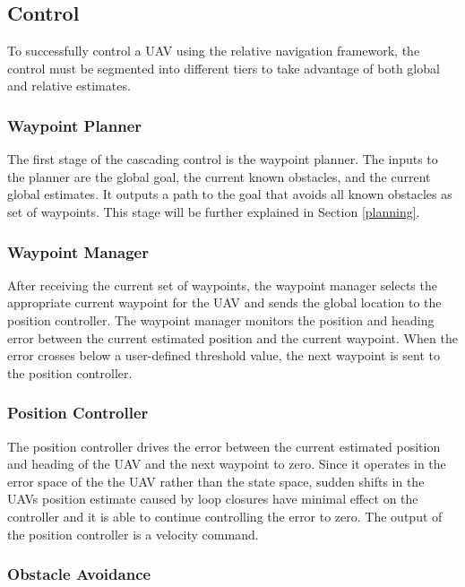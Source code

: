 \documentclass[letterpaper, 10 pt, conference]{ieeeconf}  %
\begin{document}
\subsection{Control}

To successfully control a UAV using the relative navigation framework, the control must be segmented into different tiers to take advantage of both global and relative estimates.

\subsubsection{Waypoint Planner}

The first stage of the cascading control is the waypoint planner. The inputs to the planner are the global goal, the current known obstacles, and the current global estimates. It outputs a path to the goal that avoids all known obstacles as set of waypoints. This stage will be further explained in Section \ref{planning}.

\subsubsection{Waypoint Manager}

After receiving the current set of waypoints, the waypoint manager selects the appropriate current waypoint for the UAV and sends the global location to the position controller. The waypoint manager monitors the position and heading error between the current estimated position and the current waypoint. When the error crosses below a user-defined threshold value, the next waypoint is sent to the position controller.

\subsubsection{Position Controller}

The position controller drives the error between the current estimated position and heading of the UAV and the next waypoint to zero. Since it operates in the error space of the the UAV rather than the state space, sudden shifts in the UAVs position estimate caused by loop closures have minimal effect on the controller and it is able to continue controlling the error to zero. The output of the position controller is a velocity command.

\subsubsection{Obstacle Avoidance} \label{obs_avoid}
\end{document}
